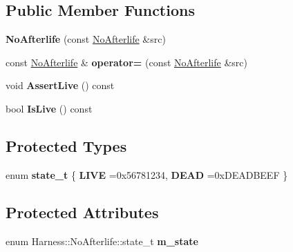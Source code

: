 \subsection*{Public Member Functions}
\begin{DoxyCompactItemize}
\item 
\hypertarget{classHarness_1_1NoAfterlife_acc8279e524e1c9900b2bb768d534b003}{}{\bfseries No\+Afterlife} (const \hyperlink{classHarness_1_1NoAfterlife}{No\+Afterlife} \&src)\label{classHarness_1_1NoAfterlife_acc8279e524e1c9900b2bb768d534b003}

\item 
\hypertarget{classHarness_1_1NoAfterlife_a59e563a52aecc2db7fbb515b5a9a8820}{}const \hyperlink{classHarness_1_1NoAfterlife}{No\+Afterlife} \& {\bfseries operator=} (const \hyperlink{classHarness_1_1NoAfterlife}{No\+Afterlife} \&src)\label{classHarness_1_1NoAfterlife_a59e563a52aecc2db7fbb515b5a9a8820}

\item 
\hypertarget{classHarness_1_1NoAfterlife_ae9483f74f0eafe38ce10a26a88e07906}{}void {\bfseries Assert\+Live} () const \label{classHarness_1_1NoAfterlife_ae9483f74f0eafe38ce10a26a88e07906}

\item 
\hypertarget{classHarness_1_1NoAfterlife_ab3b07e1412b50378326980e5f3ed086e}{}bool {\bfseries Is\+Live} () const \label{classHarness_1_1NoAfterlife_ab3b07e1412b50378326980e5f3ed086e}

\end{DoxyCompactItemize}
\subsection*{Protected Types}
\begin{DoxyCompactItemize}
\item 
\hypertarget{classHarness_1_1NoAfterlife_a05d7ce25b8fa1e71ee33c0dac39794ba}{}enum {\bfseries state\+\_\+t} \{ {\bfseries L\+I\+V\+E} =0x56781234, 
{\bfseries D\+E\+A\+D} =0x\+D\+E\+A\+D\+B\+E\+E\+F
 \}\label{classHarness_1_1NoAfterlife_a05d7ce25b8fa1e71ee33c0dac39794ba}

\end{DoxyCompactItemize}
\subsection*{Protected Attributes}
\begin{DoxyCompactItemize}
\item 
\hypertarget{classHarness_1_1NoAfterlife_af3babbf969f47253062d096253f72109}{}enum Harness\+::\+No\+Afterlife\+::state\+\_\+t {\bfseries m\+\_\+state}\label{classHarness_1_1NoAfterlife_af3babbf969f47253062d096253f72109}

\end{DoxyCompactItemize}


